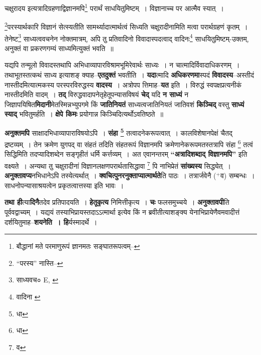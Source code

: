 \documentclass[article,12pt,a4paper]{memoir}
\newcommand{\add}[1]{($^{+}$#1)}
\begin{document}
	  \pstart चक्षुरादय इत्यत्रादिग्रहणाद्विज्ञानमपि\footnote{बौद्धानां मते परमाणुरूपं ज्ञानमतः सङ्घातरूपत्वम्--\cite{dp-msD-n}} परार्थं साधयितुमिष्टम् । विज्ञानाच्च पर आत्मैव स्यात् ।
	\pend
       

	  \pstart \footnote{“परस्य” नास्ति--\cite{dp-msB}}परस्यार्थकारि विज्ञानं सेत्स्यतीति सामर्थ्यादात्मार्थत्वं सिध्यति चक्षुरादीनामिति मत्वा परार्थग्रहणं कृतम् । तेनेष्ट\footnote{साध्यवच० \cite{dp-msA} \cite{dp-msB} \cite{dp-edP} \cite{dp-edH} E, \cite{dp-edN}} साध्यत्ववचनेन नोक्तमात्रम्, अपि तु प्रतिवादिनो विवादास्पदत्वाद् वादिनः\footnote{वादिना \cite{dp-edE}} साधयितुमिष्टम्-उक्तम्, अनुक्तं वा प्रकरणगम्यं साध्यमित्युक्तं भवति ॥
	\pend
      
	  \endgroup
	

	  \pstart यद्यपि तन्मूलो विवादस्तथापि अभिधाव्यापारविश्रामभूमिरेवार्थः साध्यः । न चात्मादिर्विवादाधिकरणम् । तथाभूतस्तत्कथं साध्य इत्याशङ् क्याह--\textbf{एतदुक्तं} भवतीति । \textbf{यदा}त्मादि \textbf{अधिकरणमा}स्पदं \textbf{विवादस्य}--अस्तीदं नास्तीदमित्यात्मकस्य परस्परविरुद्धस्य \textbf{वादस्य} । अत्रोपप\leavevmode{} त्तिमाह--\textbf{यत} इति । विरुद्धं स्वपक्षप्रत्यनीकं नास्तीदमिति वादम् । \textbf{तद्} विरुद्धवादापनेतृहेतूपन्यासविषयं \textbf{चेद्} यदि \textbf{न साध्यं} न जिज्ञापयिषित\textbf{मिदानी}मेतस्मिन्नभ्युपगमे किं \textbf{जातिनियतं} साध्यत्वजातिनियतं जातिवशं \textbf{किञ्चिद्} वस्तु \textbf{साध्यं स्याद्} भवितुमर्हति । \textbf{क्षेपे किमः} प्रयोगान्न किञ्चिदित्यर्थोऽवतिष्ठते ॥
	\pend
      

	  \pstart \textbf{अनुक्तमपि} साक्षादभिधाव्यापाराविषयोऽपि । \textbf{संहा \footnote{धा}} तत्वादनेकरूपत्वात् । कालविशेषानपेक्षं चैतद् द्रष्टव्यम् । तेन क्रमेण युगपद् वा संहतं तदिति संहतरूपं विज्ञानमपि क्रमेणानेकरूपमतस्तत्रापि संहा \footnote{धा} तत्वं सिद्धिमिति तदप्यादिशब्देन सङ्गृहीतं धर्मि कर्त्तव्यम् । अत एवानन्तरम् \textbf{“अत्रादिशब्दाद् विज्ञानमपि”} इति वक्ष्यते । अन्यथा तु चक्षुरादीनां विज्ञानलक्षणपरार्थतासिद्धावा \footnote{व} पि नाभिप्रेतं \textbf{सांख्यस्य} सिद्ध्येत् । \textbf{अनुक्तावप्य}नभिधानेऽपि तस्येत्यर्थात् । \textbf{क्वचित्पुनरनुक्ताप्यात्मार्थते}ति पाठः । तत्रार्जवेनै \add{व} सम्बन्धः । साधनोपन्यासाश्रयत्वेन प्रकृतत्वात्तस्या इति भावः ।
	\pend
      

	  \pstart \textbf{तथा ही}त्या\textbf{दिनै}तदेव प्रतिपादयति । \textbf{हेतूकृत्य} निमित्तीकृत्य । \textbf{चः} फलसमुच्चये । \textbf{अनुक्तावपी}ति पूर्ववद्वाच्यम् । यद्ययं तस्याभिप्रायस्तदाऽऽत्मार्था इत्येव किं न ब्रवीतीत्याशङ्क्य येनाभिप्रायेणैवमवादीत्तं दर्शयितुमाह--\textbf{शयनेति । हि}र्यस्मादर्थे ।
	\pend
      \leavevmode{}
	  \bigskip
	  \begingroup
	
\end{document}
